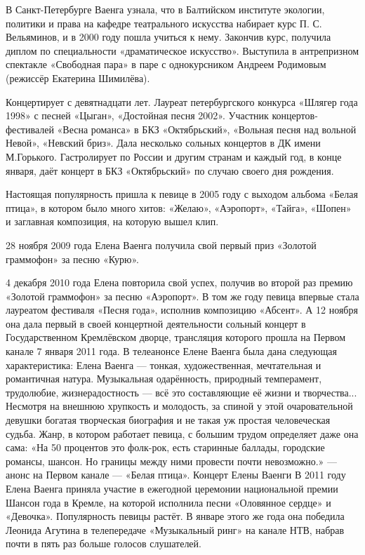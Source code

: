 В Санкт-Петербурге Ваенга узнала, что в Балтийском институте экологии, политики и права на кафедре театрального искусства набирает курс П. С. Вельяминов, и в 2000 году пошла учиться к нему. Закончив курс, получила диплом по специальности «драматическое искусство». Выступила в антрепризном спектакле «Свободная пара» в паре с однокурсником Андреем Родимовым (режиссёр Екатерина Шимилёва).

Концертирует с девятнадцати лет. Лауреат петербургского конкурса «Шлягер года 1998» с песней «Цыган», «Достойная песня 2002». Участник концертов-фестивалей «Весна романса» в БКЗ «Октябрьский», «Вольная песня над вольной Невой», «Невский бриз». Дала несколько сольных концертов в ДК имени М.Горького. Гастролирует по России и другим странам и каждый год, в конце января, даёт концерт в БКЗ «Октябрьский» по случаю своего дня рождения.

Настоящая популярность пришла к певице в 2005 году с выходом альбома «Белая птица», в котором было много хитов: «Желаю», «Аэропорт», «Тайга», «Шопен» и заглавная композиция, на которую вышел клип.

28 ноября 2009 года Елена Ваенга получила свой первый приз «Золотой граммофон» за песню «Курю».

4 декабря 2010 года Елена повторила свой успех, получив во второй раз премию «Золотой граммофон» за песню «Аэропорт». В том же году певица впервые стала лауреатом фестиваля «Песня года», исполнив композицию «Абсент». А 12 ноября она дала первый в своей концертной деятельности сольный концерт в Государственном Кремлёвском дворце, трансляция которого прошла на Первом канале 7 января 2011 года. В телеанонсе Елене Ваенга была дана следующая характеристика:
Елена Ваенга --- тонкая, художественная, мечтательная и романтичная натура. Музыкальная одарённость, природный темперамент, трудолюбие, жизнерадостность --- всё это составляющие её жизни и творчества... Несмотря на внешнюю хрупкость и молодость, за спиной у этой очаровательной девушки богатая творческая биография и не такая уж простая человеческая судьба. Жанр, в котором работает певица, с большим трудом определяет даже она сама: «На 50 процентов это фолк-рок, есть старинные баллады, городские романсы, шансон. Но границы между ними провести почти невозможно.»
--- анонс на Первом канале --- «Белая птица». Концерт Елены Ваенги
В 2011 году Елена Ваенга приняла участие в ежегодной церемонии национальной премии Шансон года в Кремле, на которой исполнила песни «Оловянное сердце» и «Девочка». Популярность певицы растёт. В январе этого же года она победила Леонида Агутина в телепередаче «Музыкальный ринг» на канале НТВ, набрав почти в пять раз больше голосов слушателей.

